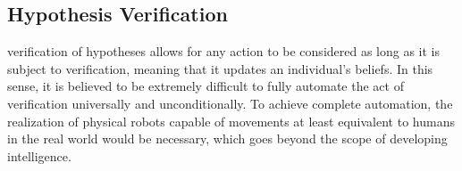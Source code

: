 \documentclass{book}
\begin{document}




\subsection{Hypothesis Verification}
verification of hypotheses allows for any action to be considered as long as it is subject to verification, meaning that it updates an individual's beliefs. In this sense, it is believed to be extremely difficult to fully automate the act of verification universally and unconditionally. To achieve complete automation, the realization of physical robots capable of movements at least equivalent to humans in the real world would be necessary, which goes beyond the scope of developing intelligence.
\end{document}
